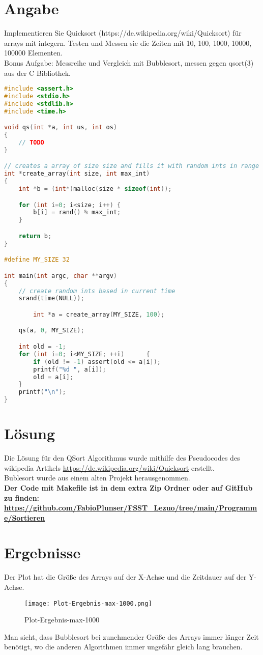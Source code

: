 \newpage
\section{Angabe}
    Implementieren Sie Quicksort (https://de.wikipedia.org/wiki/Quicksort) für arrays mit integern. Testen und Messen sie die Zeiten mit 10, 100, 1000, 10000, 100000 Elementen.\\

    \noindent Bonus Aufgabe: Messreihe und Vergleich mit Bubblesort, messen gegen qsort(3) aus der C Bibliothek.

    \begin{lstlisting}[language=C, style=CStyle, caption=Gegebener-Code, captionpos=b, label=init-CLOCK]
#include <assert.h>
#include <stdio.h>
#include <stdlib.h>
#include <time.h>

void qs(int *a, int us, int os)
{
	// TODO
}

// creates a array of size size and fills it with random ints in range 0 to max_int
int *create_array(int size, int max_int)
{
	int *b = (int*)malloc(size * sizeof(int));

	for (int i=0; i<size; i++) {
		b[i] = rand() % max_int;
	}

	return b;
}

#define MY_SIZE 32

int main(int argc, char **argv)
{
	// create random ints based in current time
	srand(time(NULL));

        int *a = create_array(MY_SIZE, 100);

	qs(a, 0, MY_SIZE);

	int old = -1;
	for (int i=0; i<MY_SIZE; ++i)      {
		if (old != -1) assert(old <= a[i]);
		printf("%d ", a[i]);
		old = a[i];
	}
	printf("\n");
}
        \end{lstlisting}

\section{Lösung}
    Die Lösung für den QSort Algorithmus wurde mithilfe des Pseudocodes des wikipedia Artikels \url{https://de.wikipedia.org/wiki/Quicksort} erstellt.\\
    Bublesort wurde aus einem alten Projekt herausgenommen.\\   
    \textbf{Der Code mit Makefile ist in dem extra Zip Ordner oder auf GitHub zu finden: \url{https://github.com/FabioPlunser/FSST_Lezuo/tree/main/Programme/Sortieren}}
\section{Ergebnisse}
    Der Plot hat die Größe des Arrays auf der X-Achse und die Zeitdauer auf der Y-Achse. 

    \begin{figure}[!htb]
        \centering
        \texttt{[image: Plot-Ergebnis-max-1000.png]}
        \caption{Plot-Ergebnis-max-1000}
        \label{caption:Plot-Ergebnis-max-1000}
    \end{figure}

    \noindent Man sieht, dass Bubblesort bei zunehmender Größe des Arrays immer länger Zeit benötigt, wo die anderen Algorithmen immer ungefähr gleich lang brauchen. 